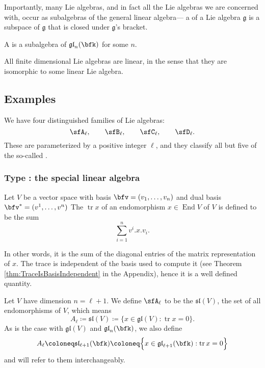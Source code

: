 \documentclass{article}
\DeclareMathOperator{\End}{End}
\DeclareMathOperator{\tr}{tr}
\newcommand*\frkg{{\ensuremath{\mathfrak{g}}}}
\newcommand*\glalg{\ensuremath{\mathfrak{gl}}}
\newcommand*\slalg{\ensuremath{\mathfrak{sl}}}
\newcommand*\acts{.}
\begin{document}
Importantly, many Lie algebras, and in fact all the Lie algebras we are concerned with, occur as subalgebras of the general linear algebra--- a  of a Lie algebra $\frkg$ is a subspace of $\frkg$ that is closed under $\frkg$'s bracket.

\begin{definition}
    A  is a subalgebra of $\glalg_n(\bfk)$ for some $n$.
\end{definition}

All finite dimensional Lie algebras are linear, in the sense that they are isomorphic to some linear Lie algebra.

\subsection{Examples}

We have four distinguished families of Lie algebras:
\[
    \sfA_\ell,\qquad
    \sfB_\ell,\qquad
    \sfC_\ell,\qquad
    \sfD_\ell.
\]
These are parameterized by a positive integer $\ell$, and they classify all but five of the so-called .

\subsubsection{Type \sfA: the special linear algebra}

\begin{definition}
    Let $V$ be a vector space with basis $\bfv = (v_1, \ldots, v_n)$ and dual basis $\bfv^\ast = (v^1, \ldots, v^n)$
    The  $\tr x$ of an endomorphism $x \in \End V$ of $V$ is defined to be the sum
    \[
        \sum_{i=1}^n 
        v^i \acts x \acts v_i.
    \]
\end{definition}

In other words, it is the sum of the diagonal entries of the matrix representation of $x$.
The trace is independent of the basis used to compute it (see Theorem \ref{thm:TraceIsBasisIndependent} in the Appendix), hence it is a well defined quantity.

\begin{definition}
    Let $V$ have dimension $n = \ell + 1$.
    We define $\sfA_\ell$ to be the  $\slalg(V)$, the set of all  endomorphisms of $V$, which means
    \[
        A_\ell
        \coloneq
        \slalg(V)
        \coloneq
        \Big\{
            x \in \glalg(V) : \tr x = 0
        \Big\}.
    \]
    As is the case with $\glalg(V)$ and $\glalg_n(\bfk)$, we also define 
    \[
        A_\ell
        \coloneq
        \slalg_{\ell+1}(\bfk)
        \coloneq
        \Big\{
            x \in \glalg_{\ell+1}(\bfk) : \tr x = 0
        \Big\}
    \]
    and will refer to them interchangeably.
\end{definition}
\end{document}
